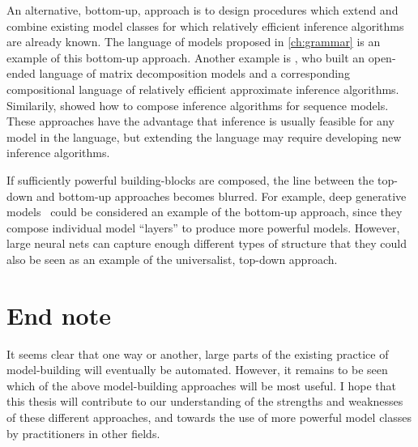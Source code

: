 An alternative, bottom-up, approach is to design procedures which extend and combine existing model classes for which relatively efficient inference algorithms are already known.
The language of models proposed in \cref{ch:grammar} is an example of this bottom-up approach.
Another example is \citet{roger-grosse-thesis}, who built an open-ended language of matrix decomposition models and a corresponding compositional language of relatively efficient approximate inference algorithms.
Similarily, \citet{christian-thesis} showed how to compose inference algorithms for sequence models.
These approaches have the advantage that inference is usually feasible for any model in the language, but extending the language may require developing new inference algorithms.

If sufficiently powerful building-blocks are composed, the line between the top-down and bottom-up approaches becomes blurred.
For example, deep generative models~\citep{adams2010learning,damianou2012deep,rippel2013high,bengio2013generalized,salakhutdinov2009deep} could be considered an example of the bottom-up approach, since they compose individual model ``layers'' to produce more powerful models.
However, large neural nets can capture enough different types of structure that they could also be seen as an example of the universalist, top-down approach.

\section{End note}
It seems clear that one way or another, large parts of the existing practice of model-building will eventually be automated.
However, it remains to be seen which of the above model-building approaches will be most useful.
I hope that this thesis will contribute to our understanding of the strengths and weaknesses of these different approaches, and towards the use of more powerful model classes by practitioners in other fields.












